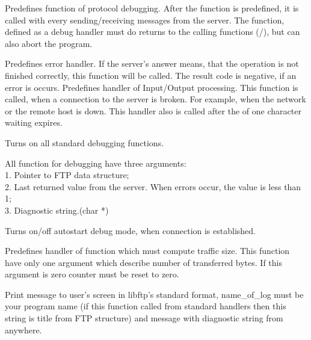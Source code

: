 {  Predefines function of protocol debugging.
   After the function is predefined, it is called with every 
   sending/receiving messages from the server.
   The function, defined as a debug handler must do returns to the calling 
functions (/), but can also abort the program. 

}

{
   Predefines error handler. If the server's answer means, that the operation is not finished 
 correctly, this function will be called.
   The result code is negative, if an error is occurs.
}
{
   Predefines handler of Input/Output processing. This function is called, when a connection to the  
   server is broken. For example, when the network or the remote host is down. This handler also is
   called after the   of one character waiting expires.   
}

{
Turns on all standard debugging functions. 

}


All function for debugging have three arguments:\\
1. Pointer to FTP data structure;\\
2. Last returned value from the server. When errors occur, the value is less than 1;\\
3. Diagnostic string.(char *)

{	Turns on/off autostart debug mode, when connection is established.
}

{
   Predefines handler of function which must compute traffic size. This 
function have only one argument which describe number of transferred bytes.
If this argument is zero counter must be reset to zero.
}


{	Print message to user's screen in libftp's standard format,
        name\_of\_log must be your program name (if this function called 
from standard handlers then this string is title from FTP structure) and 
message with diagnostic string from anywhere.} 


